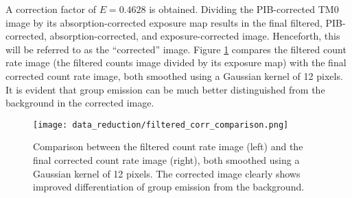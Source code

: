 A correction factor of \(E = 0.4628\) is obtained. Dividing the PIB-corrected TM0 image by its absorption-corrected exposure map results in the final filtered, PIB-corrected, absorption-corrected, and exposure-corrected image. Henceforth, this will be referred to as the \enquote{corrected} image. Figure \ref{fig:comparison_filt_corr} compares the filtered count rate image (the filtered counts image divided by its exposure map) with the final corrected count rate image, both smoothed using a Gaussian kernel of 12 pixels. It is evident that group emission can be much better distinguished from the background in the corrected image.
\begin{figure}[htbp]
    \centering
    \texttt{[image: data\_reduction/filtered\_corr\_comparison.png]}
    \caption{Comparison between the filtered count rate image (left) and the final corrected count rate image (right), both smoothed using a Gaussian kernel of 12 pixels. The corrected image clearly shows improved differentiation of group emission from the background.}
    \label{fig:comparison_filt_corr}
\end{figure}
